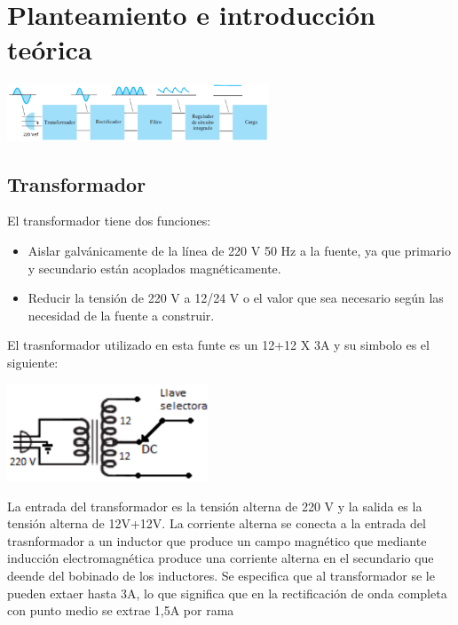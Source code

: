 \section{Planteamiento e introducción teórica} 
\includegraphics[width=7.8cm]{./imagenes/Diagra.png}
\subsection{Transformador}
\sangria{} El transformador tiene dos funciones:

\begin{itemize}
    \item Aislar galvánicamente de la línea de 220 V 50 Hz a la fuente, ya que
    primario y secundario están acoplados magnéticamente.
    \item Reducir la tensión de 220 V a 12/24 V o el valor que sea necesario según
    las necesidad de la fuente a construir.
\end{itemize}

\sangria{} El trasnformador  utilizado en esta funte es un 12+12 X 3A y su simbolo es el siguiente:

\includegraphics[width=6cm]{./imagenes/transfo.png}

\sangria{} La entrada del transformador es la tensión alterna de 220 V y la salida es la tensión alterna de 12V+12V. La corriente alterna se conecta a la entrada del trasnformador a un inductor que produce un campo magnético que mediante inducción electromagnética produce una corriente alterna en el secundario que deende del bobinado de los inductores. 
\sangria{} Se especifica que al transformador se le pueden extaer hasta 3A, lo que significa que en la rectificación de onda completa con punto medio se extrae 1,5A por rama 


